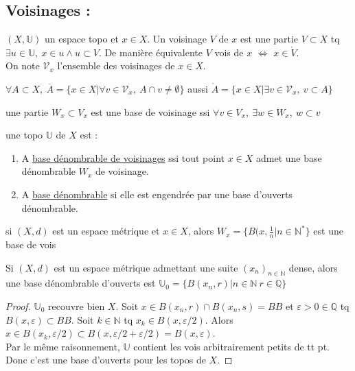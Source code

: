 \subsection{ Voisinages :}
\begin{definition}
    $(X,\mathbb{U})$ un espace topo et $x\in X$. Un voisinage $V$ de $x$ est une partie $V\subset X$ tq $\exists u\in \mathbb{U},\ x\in u \wedge u\subset V$. De manière équivalente $V$ vois de $x$ $\Leftrightarrow $ $x\in \mathring{V}$.\\
     On note $\mathcal{V}_x$ l'ensemble des voisinages de $x\in X$.
\end{definition}

\begin{definition}
$\forall A\subset X,\ \overline{A}=\{x\in X|\forall v\in \mathcal{V}_x,\ A\cap v\neq \emptyset  \}$ aussi $\mathring{A}=\{x\in X|\exists v\in \mathcal{V}_x,\ v\subset A\}$
\end{definition}
\begin{definition}
une partie $W_x\subset V_x$ est une base de voisinage ssi $\forall v\in V_x,\ \exists w\in W_x,\ w\subset v$
\end{definition}
\begin{definition}
     une topo $\mathbb{U}$ de $X$ est :
\begin{enumerate}
    \item A \underline{base dénombrable de voisinages} ssi tout point $x\in X$ admet une base dénombrable $W_x$ de voisinage.
    \item A \underline{base dénombrable} si elle est engendrée par une base d'ouverts dénombrable.
\end{enumerate}
\end{definition}
\begin{remarque}
    si $(X,d)$ est un espace métrique et $x\in X$, alors $W_x=\{B(x,\frac{1}{n}| n\in \mathbb{N} ^*\}$ est une base de vois
\end{remarque}
\begin{remarque}
    Si $(X,d)$ est un espace métrique admettant une suite $(x_n)_{n\in \mathbb{N} }$ dense, alors une base dénombrable d'ouverts est $\mathbb{U}_0=\{B(x_{n}, r)|n\in \mathbb{N} \ r\in \mathbb{Q} \}$
\end{remarque}
\begin{proof}
    $\mathbb{U}_0$ recouvre bien $X$. Soit $x\in B(x_{n}, r)\cap B(x_{n}, s)=BB$ et $\varepsilon >0 \in \mathbb{Q} $ tq $B(x,\varepsilon )\subset BB$. Soit $k\in \mathbb{N} $ tq $x_k\in B(x,\varepsilon /2)$. Alors $x\in B(x_k, \varepsilon /2)\subset B(x,\varepsilon /2 + \varepsilon /2)=B(x,\varepsilon)$. \\

Par le même raisonnement, $\mathbb{U}$ contient les vois arbitrairement petits de tt pt. Donc c'est une base d'ouverts pour les topos de $X$.
\end{proof}
